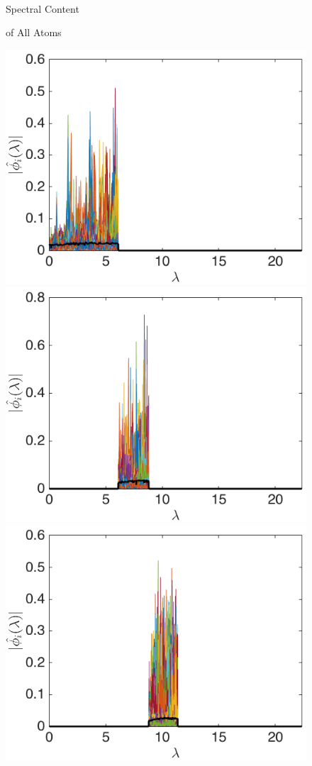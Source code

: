 \documentclass[journal, 10pt]{IEEEtran}
\begin{document}
\begin{figure}[bth]
\begin{minipage}[m]{0.16\linewidth}
\end{minipage}\\
\begin{minipage}[m]{0.16\linewidth}
\centerline{\small{Spectral Content}}
\centerline{\small{of All Atoms}}
\end{minipage}
\begin{minipage}[m]{0.16\linewidth}
\centerline{\includegraphics[width=.8\linewidth]{fig_bunny_freq_scaling3}}
\end{minipage}
\begin{minipage}[m]{0.16\linewidth}
\centerline{\includegraphics[width=.8\linewidth]{fig_bunny_freq_wav1a}}
\end{minipage}
\begin{minipage}[m]{0.16\linewidth}
\centerline{\includegraphics[width=.8\linewidth]{fig_bunny_freq_wav2a}}

\end{minipage}
\end{figure}
\end{document}
